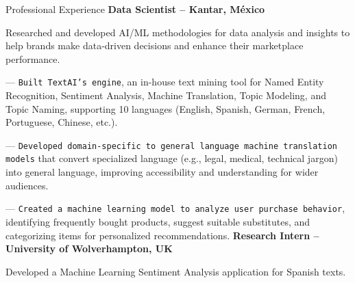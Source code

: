 \begin{rubric}{Professional Experience}
\entry*[06.2018 -- 09.2021]%
	\textbf{Data Scientist -- Kantar, México}
 
Researched and developed AI/ML methodologies for data analysis and insights to help brands make data-driven decisions and enhance their marketplace performance.\par\par
%
--- \texttt{Built TextAI’s engine}, an in-house text mining tool for Named Entity Recognition, Sentiment Analysis, Machine Translation, Topic Modeling, and Topic Naming, supporting 10 languages (English, Spanish, German, French, Portuguese, Chinese, etc.).\par

--- \texttt{Developed domain-specific to general language machine translation models} that convert specialized language (e.g., legal, medical, technical jargon) into general language, improving accessibility and understanding for wider audiences.\par

--- \texttt{Created a machine learning model to analyze user purchase behavior}, identifying frequently bought products, suggest suitable substitutes, and categorizing items for personalized recommendations. 
%
%
\entry*[02.2017 -- 08.2017]%
	\textbf{Research Intern -- University of Wolverhampton, UK}
 
 Developed a Machine Learning Sentiment Analysis application for Spanish texts.
%
\end{rubric}
